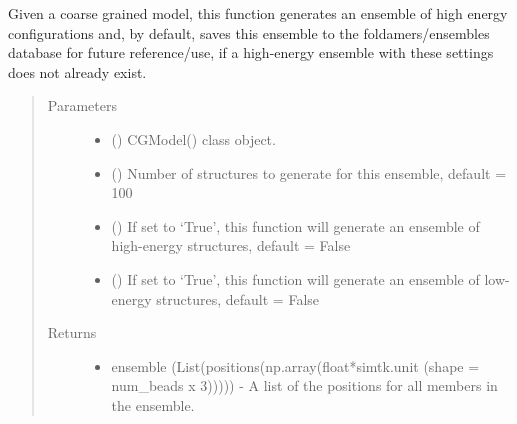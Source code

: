 \documentclass[letterpaper,12pt,english,openany,oneside]{sphinxmanual}
\begin{document}
\begin{fulllineitems}
\label{\detokenize{ensembles:ensembles.ens_build.get_ensemble}}
Given a coarse grained model, this function generates an ensemble of high energy configurations and, by default, saves this ensemble to the foldamers/ensembles database for future reference/use, if a high-energy ensemble with these settings does not already exist.
\begin{quote}\begin{description}
\item[{Parameters}] \leavevmode\begin{itemize}
\item {} 
 () \textendash{} CGModel() class object.

\item {} 
 () \textendash{} Number of structures to generate for this ensemble, default = 100

\item {} 
 () \textendash{} If set to ‘True’, this function will generate an ensemble of high-energy structures, default = False

\item {} 
 () \textendash{} If set to ‘True’, this function will generate an ensemble of low-energy structures, default = False

\end{itemize}

\item[{Returns}] \leavevmode
\begin{itemize}
\item {} 
ensemble (List(positions(np.array(float*simtk.unit (shape = num\_beads x 3))))) - A list of the positions for all members in the ensemble.

\end{itemize}


\end{description}\end{quote}

\end{fulllineitems}
\end{document}
